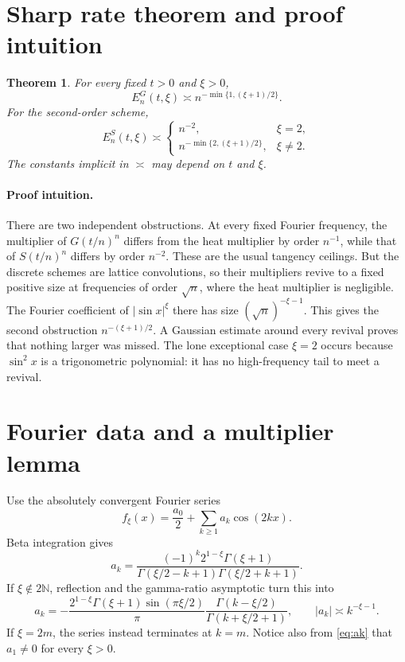 \documentclass[11pt,a4paper]{article}
\newtheorem{theorem}{Theorem}
\newcommand{\N}{\mathbb N}
\begin{document}
\section*{Sharp rate theorem and proof intuition}
\begin{theorem}\label{thm:main}
For every fixed $t>0$ and $\xi>0$,
\begin{equation}\label{eq:G-rate}
 E^G_n(t,\xi)\asymp n^{-\min\{1,(\xi+1)/2\}}.
\end{equation}
For the second-order scheme,
\begin{equation}\label{eq:S-rate}
 E^S_n(t,\xi)\asymp
 \begin{cases}
 n^{-2},&\xi=2,\\
 n^{-\min\{2,(\xi+1)/2\}},&\xi\ne2.
 \end{cases}
\end{equation}
The constants implicit in $\asymp$ may depend on $t$ and $\xi$.
\end{theorem}

\paragraph{Proof intuition.}
There are two independent obstructions.  At every fixed Fourier frequency,
the multiplier of $G(t/n)^n$ differs from the heat multiplier by order
$n^{-1}$, while that of $S(t/n)^n$ differs by order $n^{-2}$.  These are the
usual tangency ceilings.  But the discrete schemes are lattice convolutions,
so their multipliers revive to a fixed positive size at frequencies of order
$\sqrt n$, where the heat multiplier is negligible.  The Fourier coefficient
of $|\sin x|^\xi$ there has size
$(\sqrt n)^{-\xi-1}$.  This gives the second obstruction
$n^{-(\xi+1)/2}$.  A Gaussian estimate around every revival proves that
nothing larger was missed.  The lone exceptional case $\xi=2$ occurs because
$\sin^2x$ is a trigonometric polynomial: it has no high-frequency tail to
meet a revival.

\section*{Fourier data and a multiplier lemma}
Use the absolutely convergent Fourier series
\[
 f_\xi(x)=\frac{a_0}{2}+\sum_{k\ge1}a_k\cos(2kx).
\]
Beta integration gives
\begin{equation}\label{eq:ak}
 a_k=\frac{(-1)^k2^{1-\xi}\Gamma(\xi+1)}
 {\Gamma(\xi/2-k+1)\Gamma(\xi/2+k+1)}.
\end{equation}
If $\xi\notin2\N$, reflection and the gamma-ratio asymptotic turn this into
\begin{equation}\label{eq:ak-asymp}
 a_k=-\frac{2^{1-\xi}\Gamma(\xi+1)\sin(\pi\xi/2)}{\pi}
 \frac{\Gamma(k-\xi/2)}{\Gamma(k+\xi/2+1)},
 \qquad |a_k|\asymp k^{-\xi-1}.
\end{equation}
If $\xi=2m$, the series instead terminates at $k=m$.  Notice also from
\eqref{eq:ak} that $a_1\ne0$ for every $\xi>0$.
\end{document}

